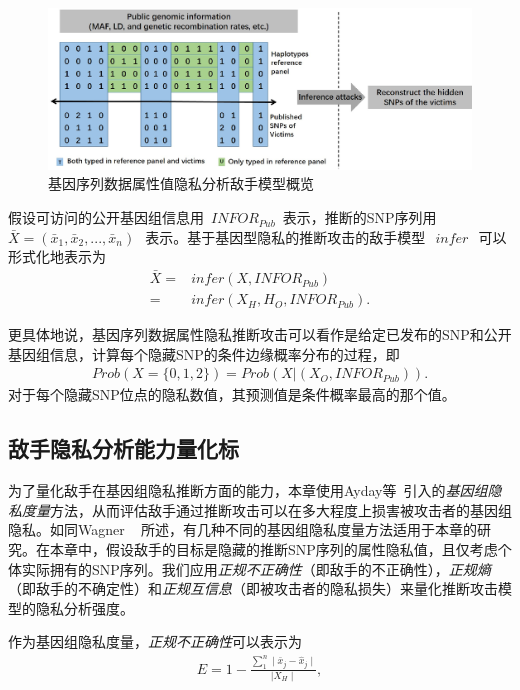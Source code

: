 \begin{figure}[htbp]
	\centering
	\includegraphics[width = 0.95\linewidth]{./figures/Fig2-adversary-model.eps}
	\caption{基因序列数据属性值隐私分析敌手模型概览}
	\label{fig:adversary-model}
\end{figure}

假设可访问的公开基因组信息用~${INFOR}_{Pub}$~表示，推断的SNP序列用~$\bar{X}=(\bar{x}_1, \bar{x}_2,...,\bar{x}_n)~$~表示。基于基因型隐私的推断攻击的敌手模型~$~infer~$~可以形式化地表示为
\begin{align}\label{eq:adversary-model}
\bar{X} =& infer(X,{INFOR}_{Pub})  \nonumber \\
= & infer(X_H,H_O,{INFOR}_{Pub}).
\end{align}

更具体地说，基因序列数据属性隐私推断攻击可以看作是给定已发布的SNP和公开基因组信息，计算每个隐藏SNP的条件边缘概率分布的过程，即
\begin{align}\label{eq:adversary-model-prob}
Prob(X=\{0,1,2\})=Prob(X|(X_O,{INFOR}_{Pub})).
\end{align}
对于每个隐藏SNP位点的隐私数值，其预测值是条件概率最高的那个值。

\subsection{敌手隐私分析能力量化标}


为了量化敌手在基因组隐私推断方面的能力，本章使用Ayday等~\cite{ayday2013personal}引入的\textit{基因组隐私度量}方法，从而评估敌手通过推断攻击可以在多大程度上损害被攻击者的基因组隐私。如同Wagner
~\cite{wagner2017evaluating}
所述，有几种不同的基因组隐私度量方法适用于本章的研究。在本章中，假设敌手的目标是隐藏的推断SNP序列的属性隐私值，且仅考虑个体实际拥有的SNP序列。我们应用\textit{正规不正确性}（即敌手的不正确性），\textit{正规熵}（即敌手的不确定性）和\textit{正规互信息}（即被攻击者的隐私损失）来量化推断攻击模型的隐私分析强度。

作为基因组隐私度量，\textit{正规不正确性}可以表示为
\begin{align}\label{eq:metric-correctness}
E=1- \frac{\sum_1^n \mid \bar{x}_j - \hat{x}_j \mid}  {\mid X_H \mid},
\end{align}

